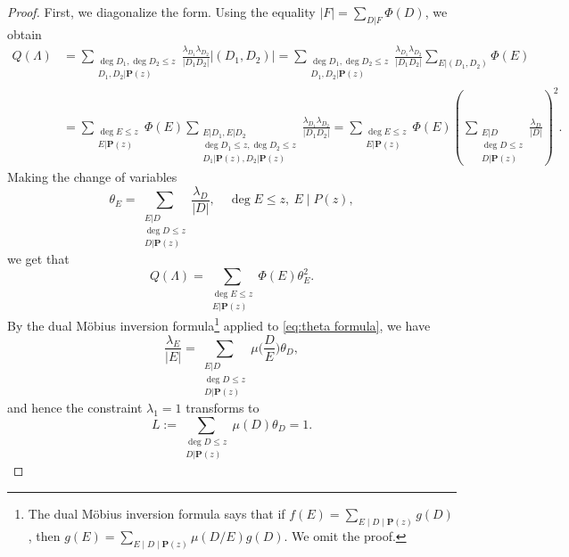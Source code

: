 \documentclass[12pt]{amsart}
\numberwithin{equation}{section}
\theoremstyle{definition}
\theoremstyle{remark}
\newcommand{\ps}[1]{\left( #1 \right)}
\begin{document}
\begin{proof}
    First, we diagonalize the form. 
    Using the equality $|F|=\sum_{D|F} \Phi(D)$, we obtain
    \begin{align*}
        Q(\Lambda) &= \sum_{\substack{\deg D_1, \deg D_2 \leq z \\ D_1, D_2 | \mathbf{P}(z)}} \frac{\lambda_{D_1} \lambda_{D_2}}{|D_1 D_2|} |(D_1,D_2)| = 
        \sum_{\substack{\deg D_1, \deg D_2 \leq z \\ D_1, D_2 | \mathbf{P}(z)}} \frac{\lambda_{D_1} \lambda_{D_2}}{|D_1 D_2|} \sum_{E|(D_1,D_2)} \Phi(E)  \\
        &= \sum_{\substack{\deg E \leq z \\ E|\mathbf{P}(z)}} \Phi(E) \sum_{\substack{E|D_1, E|D_2 \\ \deg D_1 \leq z, \deg D_2 \leq z \\ D_1|\mathbf{P}(z), D_2|\mathbf{P}(z)}} \frac{\lambda_{D_1} \lambda_{D_2}}{|D_1 D_2|} = 
        \sum_{\substack{\deg E \leq z \\ E|\mathbf{P}(z)}} \Phi(E) \ps{\sum_{\substack{E|D \\ \deg D \leq z \\ D | \mathbf{P}(z)}} \frac{\lambda_D}{|D|}}^2.
    \end{align*}
    Making the change of variables 
    \begin{equation} \label{eq:theta formula}
        \theta_E = \sum_{\substack{E|D \\ \deg D \leq z \\ D | \mathbf{P}(z)}} \frac{\lambda_D}{|D|}, \quad \deg E\leq z, \ E\mid P(z),
    \end{equation}
    we get that 
    \begin{equation}
         Q(\Lambda) = \sum_{\substack{\deg E \leq z \\ E|\mathbf{P}(z)}} \Phi(E) \theta_E^2.
    \end{equation}
    By the dual M\"{o}bius inversion formula\footnote{The dual M\"{o}bius inversion formula says that if $f(E) = \sum_{E\mid D\mid \mathbf{P}(z)} g(D)$, then $g(E) = \sum_{E\mid D\mid \mathbf{P}(z)} \mu(D/E) g(D)$. We omit the proof.} applied to \eqref{eq:theta formula}, we have
    \[
        \frac{\lambda_E}{|E|} = \sum_{\substack{E|D \\ \deg D \leq z \\ D | \mathbf{P}(z)}} \mu\bigg(\frac{D}{E}\bigg) \theta_D,
    \]
    and hence the constraint $\lambda_1=1$ transforms to
    \begin{equation}\label{constraint theta}
        L:=\sum_{\substack{\deg D \leq z \\ D| \mathbf{P}(z)}} \mu(D) \theta_D = 1.

\end{equation}
\end{proof}
\end{document}
